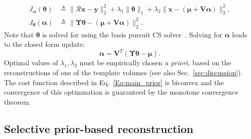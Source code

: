 \documentclass[journal]{IEEEtran}
\begin{document}
\begin{align}
J_{\boldsymbol{\alpha}}(\boldsymbol{\theta}) &\triangleq \lVert\boldsymbol{\mathcal{R} x- y}\rVert_2^2  + \lambda_1\lVert\boldsymbol{\theta}\rVert_1+\lambda_2\lVert\boldsymbol{x} - (\boldsymbol{\mu + V\alpha})\rVert_2^2, \\
J_{\boldsymbol\theta}(\boldsymbol{\alpha}) &\triangleq \lVert\boldsymbol{\Upsilon\theta} - (\boldsymbol{\mu + V\alpha})\rVert_2^2.
\end{align}
Note that $\boldsymbol{\theta}$ is solved for using the basis pursuit CS solver~\cite{l1ls}. Solving for $\boldsymbol{\alpha}$ leads to the closed form update:
\begin{equation}
\boldsymbol{\boldsymbol{\alpha}} = \boldsymbol{V}^T(\boldsymbol{\Upsilon \theta} -\boldsymbol{\mu}).
\end{equation}
 Optimal values of $\lambda_1, \lambda_2$ must be empirically chosen \textit{a priori}, based on the reconstructions of one of the template volumes (see also Sec.~\ref{sec:discussion}). The cost function described in Eq.~\ref{Eq:main_prior} is biconvex and the convergence of this optimization is guaranteed by the monotone convergence theorem.
 \vspace{2mm}

\subsection{\textbf{Selective prior-based reconstruction}}
\label{sec:selective_prior}
\end{document}

